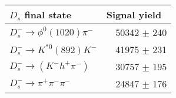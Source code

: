  \begin{tabular}{l r }
\hline\hline
$D_s$ final state  & Signal yield\ \\
\hline
$D_{s}^{-} \to \phi^{0}(1020)\pi^{-}$ & 50342 $\pm$ 240 \\
$D_{s}^{-}\to K^{*0}(892)K^{-}$ & 41975 $\pm$ 231 \\
$D_{s}^{-}\to (K^{-}h^{+}\pi^{-})$ & 30757 $\pm$ 195 \\
$D_{s}^{-}\to \pi^{+}\pi^{-}\pi^{-}$ & 24847 $\pm$ 176 \\
\hline\hline
\end{tabular}
\label{table:normYieldsDs}

